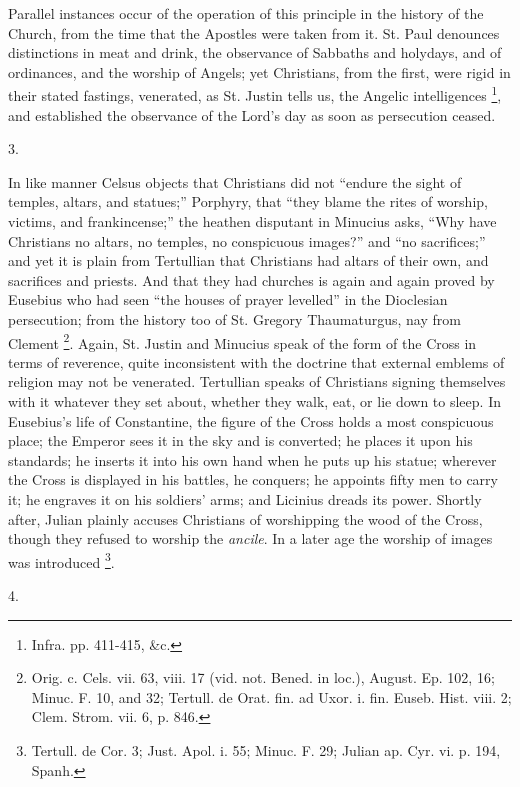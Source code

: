Parallel instances occur of the operation of this
principle in the history of the Church, from the time
that the Apostles were taken from it. St. Paul denounces
distinctions in meat and drink, the observance of
Sabbaths and holydays, and of ordinances, and the worship
of Angels; yet Christians, from the first, were rigid in
their stated fastings, venerated, as St. Justin tells us,
the Angelic intelligences \footnote{Infra. pp. 411-415, \&c.}, and established the
observance of the Lord's day as soon as persecution
ceased.

3.

In like manner Celsus objects that Christians did not
``endure the sight of temples, altars, and
statues;'' Porphyry, that ``they blame the rites
of worship, victims, and frankincense;'' the heathen
disputant in Minucius asks, ``Why have Christians no
altars, no temples, no conspicuous images?'' and
``no sacrifices;'' and yet it is plain from
Tertullian that Christians had altars of their own, and
sacrifices and priests. And that they had churches is
again and again proved by Eusebius who had seen ``the
houses of prayer levelled'' in the Dioclesian
persecution; from the history too of St. Gregory
Thaumaturgus, nay from Clement \footnote{Orig. c. Cels. vii. 63, viii.
17 (vid. not. Bened. in loc.), August. Ep. 102, 16;
Minuc. F. 10, and 32; Tertull. de Orat. fin. ad Uxor. i.
fin. Euseb. Hist. viii. 2; Clem. Strom. vii. 6, p. 846.}. Again, St. Justin and
Minucius speak of the form of the Cross in terms of
reverence, quite inconsistent with the doctrine that
external emblems of religion may not be venerated.
Tertullian speaks of Christians signing themselves with
it whatever they set about, whether they walk, eat, or
lie down to sleep. In Eusebius's life of Constantine, the
figure of the Cross holds a most conspicuous place; the
Emperor sees it in the sky and is converted; he places it
upon his standards; he inserts it into his own hand when
he puts up his statue; wherever the Cross is displayed in
his battles, he conquers; he appoints fifty men to carry
it; he engraves it on his soldiers' arms; and Licinius
dreads its power. Shortly after, Julian plainly accuses
Christians of worshipping the wood of the Cross, though
they refused to worship the \emph{ancile}. In a later age the
worship of images was introduced \footnote{Tertull. de Cor. 3; Just.
Apol. i. 55; Minuc. F. 29; Julian ap. Cyr. vi. p. 194,
Spanh.}.

4.

